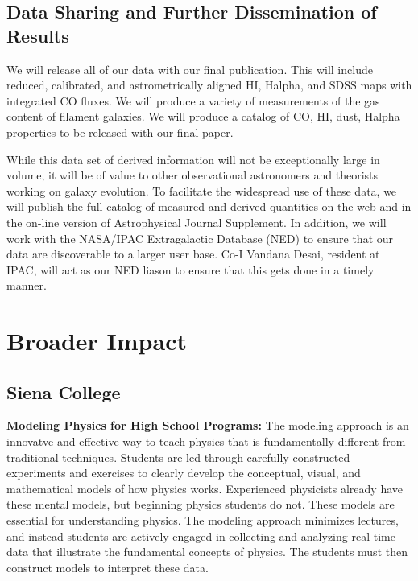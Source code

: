 \documentclass[11pt, preprint]{aastex}
\begin{document}
{\vspace*{-.8cm}\subsection{Data Sharing and Further Dissemination of Results }
\vspace*{-.3cm}

We will release all of our data with our final publication.  This will include 
reduced, calibrated, and astrometrically aligned HI,
Halpha, and SDSS maps with integrated CO fluxes.
We will produce a variety of measurements of the gas content of
filament galaxies.  We will produce a catalog of CO, HI, dust, Halpha
properties to be released with our final paper.

While this data set of derived information will not be exceptionally
large in volume, it will be of value to other observational
astronomers and theorists working on galaxy evolution. To facilitate
the widespread use of these data, we will publish the full catalog of
measured and derived quantities on the web and in the on-line version
of Astrophysical Journal Supplement. In addition, we will work with
the NASA/IPAC Extragalactic Database (NED) to ensure that our data are
discoverable to a larger user base. Co-I Vandana Desai, resident at
IPAC, will act as our NED liason to ensure that this gets done in a
timely manner.

\vspace*{-.7cm}
\section{Broader Impact}

\vspace*{-.4cm}
\subsection{Siena College}
\vspace*{-.4cm}

{\bf Modeling Physics for High School Programs:  }
The modeling
approach is an innovatve and effective way to teach physics that is 
fundamentally different from traditional techniques.  Students are led through
carefully constructed experiments and exercises to clearly develop the conceptual, 
visual, and mathematical models of how physics works.  
Experienced physicists already have these mental models, 
but beginning physics students do not.
These models are essential for understanding physics.
The modeling approach minimizes lectures, and instead 
students are actively engaged in collecting and analyzing real-time data
that illustrate the fundamental concepts of physics.   The students must
then construct models to interpret these
data.  

}
\end{document}
